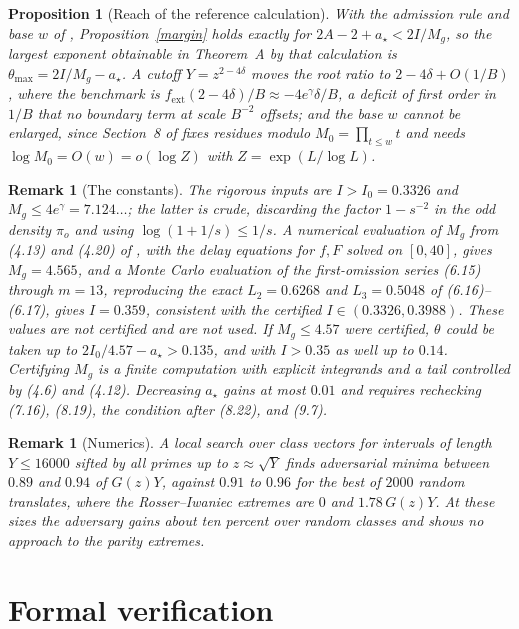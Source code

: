 \documentclass[11pt]{amsart}
\newtheorem{proposition}[lemma]{Proposition}
\newtheorem{remark}[lemma]{Remark}
\newcommand{\Mg}{M_g}
\newcommand{\astar}{a_\star}
\newcommand{\fext}{f_{\mathrm{ext}}}
\begin{document}
\begin{proposition}[Reach of the reference calculation]\label{nopower}
With the admission rule and base $w$ of \cite{OAI}, Proposition~\ref{margin} holds exactly for $2A-2+\astar<2I/\Mg$, so the largest exponent obtainable in Theorem~A by that calculation is $\theta_{\max}=2I/\Mg-\astar$. A cutoff $Y=z^{2-4\delta}$ moves the root ratio to $2-4\delta+O(1/B)$, where the benchmark is $\fext(2-4\delta)/B\approx-4e^{\gamma}\delta/B$, a deficit of first order in $1/B$ that no boundary term at scale $B^{-2}$ offsets; and the base $w$ cannot be enlarged, since Section~8 of \cite{OAI} fixes residues modulo $M_0=\prod_{t\le w}t$ and needs $\log M_0=O(w)=o(\log Z)$ with $Z=\exp(L/\log L)$.
\end{proposition}

\begin{remark}[The constants]
The rigorous inputs are $I>I_0=0.3326$ and $\Mg\le4e^\gamma=7.124\ldots$; the latter is crude, discarding the factor $1-s^{-2}$ in the odd density $\pi_o$ and using $\log(1+1/s)\le1/s$. A numerical evaluation of $\Mg$ from (4.13) and (4.20) of \cite{OAI}, with the delay equations for $f,F$ solved on $[0,40]$, gives $\Mg=4.565$, and a Monte Carlo evaluation of the first-omission series (6.15) through $m=13$, reproducing the exact $L_2=0.6268$ and $L_3=0.5048$ of (6.16)--(6.17), gives $I=0.359$, consistent with the certified $I\in(0.3326,0.3988)$. These values are not certified and are not used. If $\Mg\le4.57$ were certified, $\theta$ could be taken up to $2I_0/4.57-\astar>0.135$, and with $I>0.35$ as well up to $0.14$. Certifying $\Mg$ is a finite computation with explicit integrands and a tail controlled by (4.6) and (4.12). Decreasing $\astar$ gains at most $0.01$ and requires rechecking (7.16), (8.19), the condition after (8.22), and (9.7).
\end{remark}

\begin{remark}[Numerics]
A local search over class vectors for intervals of length $Y\le16000$ sifted by all primes up to $z\approx\sqrt Y$ finds adversarial minima between $0.89$ and $0.94$ of $G(z)Y$, against $0.91$ to $0.96$ for the best of $2000$ random translates, where the Rosser--Iwaniec extremes are $0$ and $1.78\,G(z)Y$. At these sizes the adversary gains about ten percent over random classes and shows no approach to the parity extremes.
\end{remark}

\section{Formal verification}\label{sec:formal}
\end{document}
